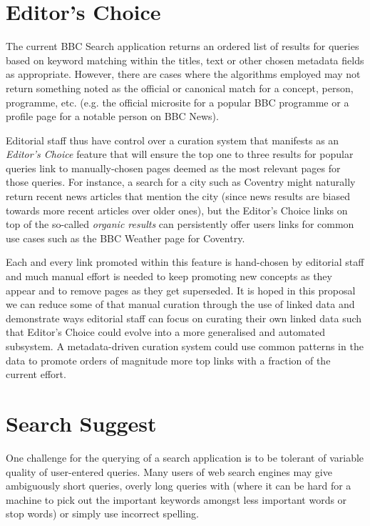 \documentclass[10pt,a4paper]{report}
\begin{document}
\section{Editor's Choice}

The current BBC Search application returns an ordered list of results
for queries based on keyword matching within the titles, text or other
chosen metadata fields as appropriate. However, there are cases where
the algorithms employed may not return something noted as the official
or canonical match for a concept, person, programme, etc. (e.g. the
official microsite for a popular BBC programme or a profile page for
a notable person on BBC News).

Editorial staff thus have control over a curation system that manifests
as an \emph{Editor's Choice} feature that will ensure the top one to three
results for popular queries link to manually-chosen pages deemed as the most
relevant pages for those queries. For instance, a search for a city such
as Coventry might naturally return recent news articles that mention the
city (since news results are biased towards more recent articles over older
ones), but the Editor's Choice links on top of the so-called \emph{organic
results} can persistently offer users links for common use cases such as
the BBC Weather page for Coventry.

Each and every link promoted within this feature is hand-chosen by editorial
staff and much manual effort is needed to keep promoting new concepts
as they appear and to remove pages as they get superseded. It is hoped
in this proposal we can reduce some of that manual curation through the use
of linked data and demonstrate ways editorial staff can focus on curating
their own linked data such that Editor's Choice could evolve into a more
generalised and automated subsystem. A metadata-driven curation system
could use common patterns in the data to promote orders of magnitude more
top links with a fraction of the current effort.

\section{Search Suggest}

One challenge for the querying of a search application is to be tolerant
of variable quality of user-entered queries. Many users of web search
engines may give ambiguously short queries, overly long queries with (where
it can be hard for a machine to pick out the important keywords amongst
less important words or stop words) or simply use incorrect spelling.
\end{document}
